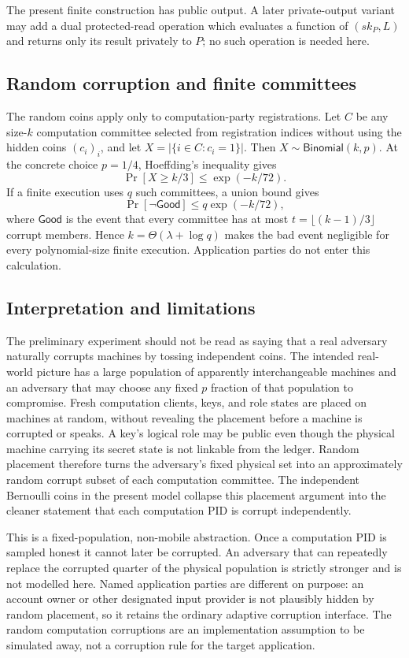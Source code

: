 The present finite construction has public output. A later private-output
variant may add a dual protected-read operation which evaluates a function of
$(sk_P,L)$ and returns only its result privately to $P$; no such operation is
needed here.

\subsection{Random corruption and finite committees}

The random coins apply only to computation-party registrations. Let $C$ be
any size-$k$ computation committee selected from registration indices without
using the hidden coins $(c_i)_i$, and let
$X=|\{i\in C:c_i=1\}|$. Then $X\sim\mathsf{Binomial}(k,p)$. At the concrete
choice $p=1/4$, Hoeffding's inequality gives
\[
  \Pr[X\geq k/3]\leq \exp(-k/72).
\]
If a finite execution uses $q$ such committees, a union bound gives
\[
  \Pr[\neg\mathsf{Good}]\leq q\exp(-k/72),
\]
where $\mathsf{Good}$ is the event that every committee has at most
$t=\lfloor(k-1)/3\rfloor$ corrupt members. Hence
$k=\Theta(\lambda+\log q)$ makes the bad event negligible for every
polynomial-size finite execution. Application parties do not enter this
calculation.

\subsection{Interpretation and limitations}

The preliminary experiment should not be read as saying that a real adversary
naturally corrupts machines by tossing independent coins. The intended
real-world picture has a large population of apparently interchangeable
machines and an adversary that may choose any fixed $p$ fraction of that
population to compromise. Fresh computation clients, keys, and role states
are placed on machines at random, without revealing the placement before a
machine is corrupted or speaks. A key's logical role may be public even though
the physical machine carrying its secret state is not linkable from the
ledger. Random placement therefore turns the adversary's fixed physical set
into an approximately random corrupt subset of each computation committee.
The independent Bernoulli coins in the present model collapse this placement
argument into the cleaner statement that each computation PID is corrupt
independently.

This is a fixed-population, non-mobile abstraction. Once a computation PID is
sampled honest it cannot later be corrupted. An adversary that can repeatedly
replace the corrupted quarter of the physical population is strictly stronger
and is not modelled here. Named application parties are different on purpose:
an account owner or other designated input provider is not plausibly hidden by
random placement, so it retains the ordinary adaptive corruption interface.
The random computation corruptions are an implementation assumption to be
simulated away, not a corruption rule for the target application.

